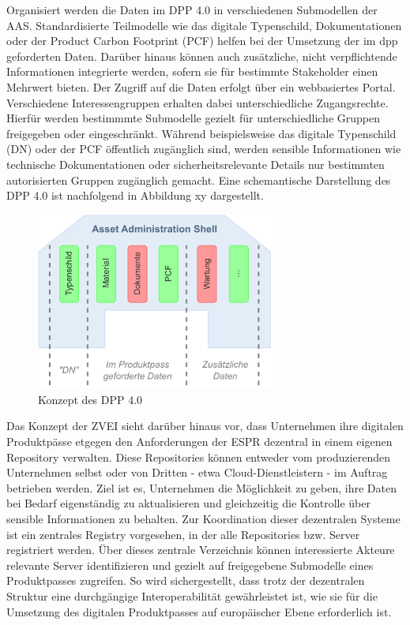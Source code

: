 Organisiert werden die Daten im DPP 4.0 in verschiedenen Submodellen der AAS. 
Standardisierte Teilmodelle wie das digitale Typenschild, Dokumentationen oder der Product Carbon Footprint (PCF) helfen bei der Umsetzung der im \acs{dpp} geforderten Daten.
Darüber hinaus können auch zusätzliche, nicht verpflichtende Informationen integrierte werden, sofern sie für bestimmte Stakeholder einen Mehrwert bieten.
Der Zugriff auf die Daten erfolgt über ein webbasiertes Portal. Verschiedene Interessengruppen erhalten dabei unterschiedliche Zugangsrechte. 
Hierfür werden bestimmmte Submodelle gezielt für unterschiedliche Gruppen freigegeben oder eingeschränkt.
Während beispielsweise das digitale Typenschild (DN) oder der PCF öffentlich zugänglich sind, werden sensible Informationen wie technische Dokumentationen oder sicherheitsrelevante Details nur bestimmten autorisierten Gruppen zugänglich gemacht.
Eine schemantische Darstellung des DPP 4.0 ist nachfolgend in Abbildung xy dargestellt.

\vspace{1em}
\begin{figure}[htbp]
    \centering
    \includegraphics[width=0.7\textwidth]{Bilder/dpp_konzept.pdf}
    \caption{Konzept des DPP 4.0}
    \label{fig:klassifizierungDT}
\end{figure}

Das Konzept der ZVEI sieht darüber hinaus vor, dass Unternehmen ihre digitalen Produktpässe etgegen den Anforderungen der ESPR dezentral in einem eigenen Repository verwalten. 
Diese Repositories können entweder vom produzierenden Unternehmen selbst oder von Dritten - etwa Cloud-Dienstleistern - im Auftrag betrieben werden. 
Ziel ist es, Unternehmen die Möglichkeit zu geben, ihre Daten bei Bedarf eigenständig zu aktualisieren und gleichzeitig die Kontrolle über sensible Informationen zu behalten.
Zur Koordination dieser dezentralen Systeme ist ein zentrales Registry vorgesehen, in der alle Repositories bzw. Server registriert werden.
Über dieses zentrale Verzeichnis können interessierte Akteure relevante Server identifizieren und gezielt auf freigegebene Submodelle eines Produktpasses zugreifen.
So wird sichergestellt, dass trotz der dezentralen Struktur eine durchgängige Interoperabilität gewährleistet ist, wie sie für die Umsetzung des digitalen Produktpasses auf europäischer Ebene erforderlich ist.

